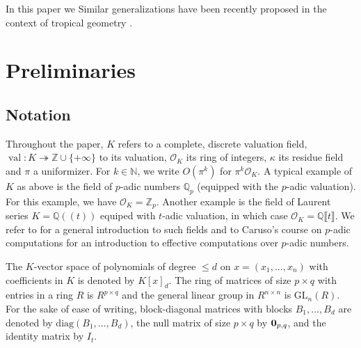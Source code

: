 \documentclass[a4paper,oneside,11pt]{article}
\newcommand{\N}{\mathbb{N}} %
\DeclareMathOperator{\val}{val}
\def\QQ{\ensuremath{\mathbb{Q}}}
\def\ZZ{\ensuremath{\mathbb{Z}}}
\newcommand{\OK}{\mathcal{O}_K}
\def\diag{\mathrm{diag}}
\newcommand{\GL}{\mathrm{GL}}
\begin{document}
In this paper we 
Similar generalizations have been recently proposed in the context of tropical geometry \cite{iriarte2022polyhedral}.



\section{Preliminaries}





\subsection{Notation}

Throughout the paper, $K$ refers to a complete,
discrete valuation field, $\val : K \twoheadrightarrow \ZZ \cup \{+\infty\}$ to its valuation,
$\OK$ its ring of integers, $\kappa$ its residue field and $\pi$ a uniformizer.
For $k \in \N$, we write $O(\pi^k)$ for $\pi^k \OK$.
A typical example of $K$ as above is the field of $p$-adic numbers 
$\QQ_p$ (equipped with the $p$-adic valuation). For this example, we 
have $\OK = \ZZ_p$.
Another example is the field of Laurent series
$K=\QQ(\!(t)\!)$ equiped with $t$-adic valuation,
in which case $\OK = \QQ \llbracket t \rrbracket$.
We refer to \cite{Serre:1979} for a
general introduction to such fields
and to Caruso's course on $p$-adic computations \cite{caruso_computations_2017}
for an introduction to effective computations over $p$-adic numbers.

The $K$-vector space of polynomials of degree $\leq d$ on $x=(x_1,\ldots,x_n)$
with coefficients in $K$ is denoted by $K[x]_{d}$. The ring of matrices of
size $p \times q$ with entries in a ring $R$ is $R^{p \times q}$ and the general
linear group in $R^{n \times n}$ is $\GL_n(R)$.
For the sake of ease of writing, block-diagonal matrices with blocks
$B_1,\ldots,B_d$ are denoted by $\diag(B_1, \ldots, B_d)$, the null matrix of
size $p \times q$ by ${\bf 0}_{p,q}$, and the identity matrix by $I_t$.
\end{document}
